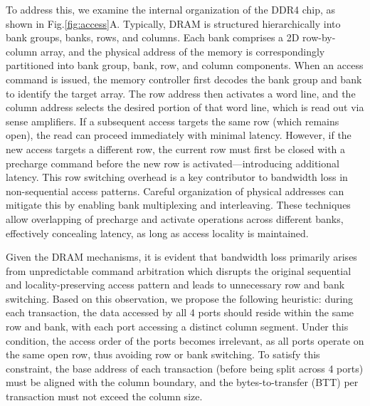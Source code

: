 \documentclass[conference]{IEEEtran}
\begin{document}
To address this, we examine the internal organization of the DDR4\cite{sohn20121} chip, as shown in Fig.\ref{fig:access}A. Typically, DRAM is structured hierarchically into bank groups, banks, rows, and columns. Each bank comprises a 2D row-by-column array, and the physical address of the memory is correspondingly partitioned into bank group, bank, row, and column components.
When an access command is issued, the memory controller first decodes the bank group and bank to identify the target array. The row address then activates a word line, and the column address selects the desired portion of that word line, which is read out via sense amplifiers. If a subsequent access targets the same row (which remains open), the read can proceed immediately with minimal latency. However, if the new access targets a different row, the current row must first be closed with a precharge command before the new row is activated—introducing additional latency. This row switching overhead is a key contributor to bandwidth loss in non-sequential access patterns.
Careful organization of physical addresses can mitigate this by enabling bank multiplexing and interleaving. These techniques allow overlapping of precharge and activate operations across different banks, effectively concealing latency, as long as access locality is maintained.

Given the DRAM mechanisms, it is evident that bandwidth loss primarily arises from unpredictable command arbitration which disrupts the original sequential and locality-preserving access pattern and leads to unnecessary row and bank switching. 
Based on this observation, we propose the following heuristic: during each transaction, the data accessed by all 4 ports should reside within the same row and bank, with each port accessing a distinct column segment. Under this condition, the access order of the ports becomes irrelevant, as all ports operate on the same open row, thus avoiding row or bank switching.
To satisfy this constraint, the base address of each transaction (before being split across 4 ports) must be aligned with the column boundary, and the bytes-to-transfer (BTT) per transaction must not exceed the column size. 
\end{document}
